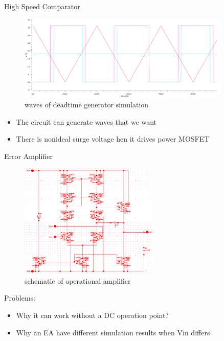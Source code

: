 \documentclass[10pt,mathserif]{beamer}%
\begin{document}
\begin{frame}{High Speed Comparator}
    \begin{figure}
    \includegraphics[width=0.9\textwidth]{images/pwm_with_deadtime_simulation_wave.bmp}
    \caption{waves of deadtime generator simulation}
    \end{figure}
    \begin{itemize}
        \item The circuit can generate waves that we want
        \item There is nonideal surge voltage hen it drives power MOSFET 
    \end{itemize}
\end{frame}

\begin{frame}{Error Amplifier}
    \begin{figure}
    \includegraphics[width=0.6\textwidth]{images/operational_amplifier.bmp}
    \caption{schematic of operational amplifier}
    \end{figure}
    Problems:
    \begin{itemize}
        \item Why it can work without a DC operation point?
        \item Why an EA have different simulation results when Vin differs
    \end{itemize}
\end{frame}

{\xdbg%
\begin{frame}
\end{frame}}
\end{document}
